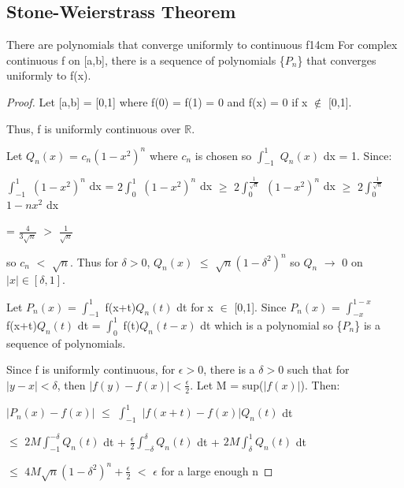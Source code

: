 \subsection[ Stone-Weierstrass ]{ Stone-Weierstrass Theorem }

    \begin{wtheorem}{There are polynomials that converge uniformly to
    continuous f}{14cm}
        For complex continuous f on [a,b], there is a sequence of polynomials
        \{$P_n$\} that converges uniformly to f(x).
    \end{wtheorem}

    \begin{proof}
        Let [a,b] = [0,1] where f(0) = f(1) = 0 and f(x) = 0 if x $\not \in$ [0,1].

        Thus, f is uniformly continuous over $\mathbb{R}$.

        Let $Q_n(x)$ = $c_n(1-x^2)^n$ where $c_n$ is chosen so
        $\int_{-1}^1$ $Q_n(x)$ dx = 1.
        Since:

        \hspace{0.5cm}
        $\int_{-1}^1$ $(1-x^2)^n$ dx
        = $2 \int_0^1$ $(1-x^2)^n$ dx
        $\geq$ $2 \int_0^{\frac{1}{\sqrt{n}}}$ $(1-x^2)^n$ dx
        $\geq$ $2 \int_0^{\frac{1}{\sqrt{n}}}$ $1-nx^2$ dx

        \hspace{3.6cm}
        = $\frac{4}{3\sqrt{n}}$
        $>$ $\frac{1}{\sqrt{n}}$

        so $c_n$ $<$ $\sqrt{n}$.
        Thus for $\delta > 0$, $Q_n(x)$ $\leq$ $\sqrt{n}(1-\delta^2)^n$
        so $Q_n$ $\rightarrow$ 0 on $|x| \in [\delta,1]$.

        Let $P_n(x)$ = $\int_{-1}^1$ f(x+t)$Q_n(t)$ dt for x $\in$ [0,1].
        Since $P_n(x)$ = $\int_{-x}^{1-x}$ f(x+t)$Q_n(t)$ dt
        = $\int_0^1$ f(t)$Q_n(t-x)$ dt which is a polynomial so \{$P_n$\}
        is a sequence of polynomials.

        Since f is uniformly continuous, for $\epsilon > 0$, there is a $\delta > 0$
        such that for $|y-x| < \delta$, then $|f(y) - f(x)| < \frac{\epsilon}{2}$.
        Let M = sup($|f(x)|$). Then:

        \hspace{0.5cm}
        $|P_n(x) - f(x)|$
        $\leq$ $\int_{-1}^1$ $|f(x+t)-f(x)| Q_n(t)$ dt

        \hspace{3.2cm}
        $\leq$ $2M \int_{-1}^{-\delta} Q_n(t)$ dt
                + $\frac{\epsilon}{2} \int_{-\delta}^{\delta} Q_n(t)$ dt
                + $2M \int_{\delta}^{1} Q_n(t)$ dt

        \hspace{3.2cm}
        $\leq$ $4M\sqrt{n}(1-\delta^2)^n + \frac{\epsilon}{2}$
        $<$ $\epsilon$
        \hspace{1cm}
        for a large enough n
    \end{proof}

